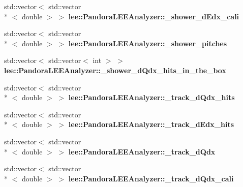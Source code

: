 \begin{DoxyCompactItemize}
\item 
\hypertarget{group__lee_gac413e11bfcca3b51ee4ab36ad94e68ba}{std\-::vector$<$ std\-::vector\\*
$<$ double $>$ $>$ {\bfseries lee\-::\-Pandora\-L\-E\-E\-Analyzer\-::\-\_\-shower\-\_\-d\-Edx\-\_\-cali}}\label{group__lee_gac413e11bfcca3b51ee4ab36ad94e68ba}

\item 
\hypertarget{group__lee_gaf56713e8dd07060973767857b7f8508f}{std\-::vector$<$ std\-::vector\\*
$<$ double $>$ $>$ {\bfseries lee\-::\-Pandora\-L\-E\-E\-Analyzer\-::\-\_\-shower\-\_\-pitches}}\label{group__lee_gaf56713e8dd07060973767857b7f8508f}

\item 
\hypertarget{group__lee_ga99371e105e8aa387ee0f0b548f788b57}{std\-::vector$<$ std\-::vector$<$ int $>$ $>$ {\bfseries lee\-::\-Pandora\-L\-E\-E\-Analyzer\-::\-\_\-shower\-\_\-d\-Qdx\-\_\-hits\-\_\-in\-\_\-the\-\_\-box}}\label{group__lee_ga99371e105e8aa387ee0f0b548f788b57}

\item 
\hypertarget{group__lee_ga4aa643d1912fe002773cb2bd1268f0f8}{std\-::vector$<$ std\-::vector\\*
$<$ double $>$ $>$ {\bfseries lee\-::\-Pandora\-L\-E\-E\-Analyzer\-::\-\_\-track\-\_\-d\-Qdx\-\_\-hits}}\label{group__lee_ga4aa643d1912fe002773cb2bd1268f0f8}

\item 
\hypertarget{group__lee_ga3ad01e55fc294c33fcff222f0efa2a1a}{std\-::vector$<$ std\-::vector\\*
$<$ double $>$ $>$ {\bfseries lee\-::\-Pandora\-L\-E\-E\-Analyzer\-::\-\_\-track\-\_\-d\-Edx\-\_\-hits}}\label{group__lee_ga3ad01e55fc294c33fcff222f0efa2a1a}

\item 
\hypertarget{group__lee_gab54b1be84b3a383b57e5b1c76b480d6b}{std\-::vector$<$ std\-::vector\\*
$<$ double $>$ $>$ {\bfseries lee\-::\-Pandora\-L\-E\-E\-Analyzer\-::\-\_\-track\-\_\-d\-Qdx}}\label{group__lee_gab54b1be84b3a383b57e5b1c76b480d6b}

\item 
\hypertarget{group__lee_gadcd255a2c652d64e4694c6b650839f43}{std\-::vector$<$ std\-::vector\\*
$<$ double $>$ $>$ {\bfseries lee\-::\-Pandora\-L\-E\-E\-Analyzer\-::\-\_\-track\-\_\-d\-Qdx\-\_\-cali}}\label{group__lee_gadcd255a2c652d64e4694c6b650839f43}


\end{DoxyCompactItemize}
